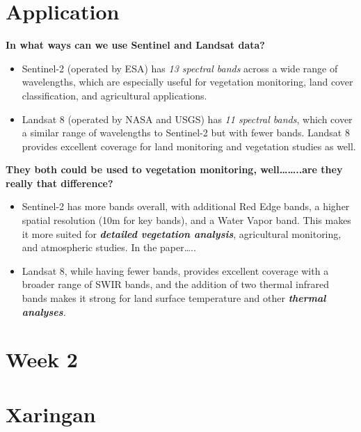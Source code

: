 \documentclass[
  letterpaper,
  DIV=11,
  numbers=noendperiod]{scrreprt}
\begin{document}

\hypertarget{application}{%
\chapter{Application}\label{application}}

\textbf{In what ways can we use Sentinel and Landsat data?}

\begin{itemize}
\item
  Sentinel-2 (operated by ESA) has \emph{13 spectral bands} across a
  wide range of wavelengths, which are especially useful for vegetation
  monitoring, land cover classification, and agricultural applications.
\item
  Landsat 8 (operated by NASA and USGS) has \emph{11 spectral bands},
  which cover a similar range of wavelengths to Sentinel-2 but with
  fewer bands. Landsat 8 provides excellent coverage for land monitoring
  and vegetation studies as well.
\end{itemize}

\textbf{They both could be used to vegetation monitoring,
well\ldots\ldots..are they really that difference?}

\begin{itemize}
\item
  Sentinel-2 has more bands overall, with additional Red Edge bands, a
  higher spatial resolution (10m for key bands), and a Water Vapor band.
  This makes it more suited for \textbf{\emph{detailed vegetation
  analysis}}, agricultural monitoring, and atmospheric studies. In the
  paper\ldots..
\item
  Landsat 8, while having fewer bands, provides excellent coverage with
  a broader range of SWIR bands, and the addition of two thermal
  infrared bands makes it strong for land surface temperature and other
  \emph{\textbf{thermal analyses}.}
\end{itemize}


\hypertarget{week-2}{%
\chapter{Week 2}\label{week-2}}


\hypertarget{xaringan}{%
\chapter{Xaringan}\label{xaringan}}
\end{document}

